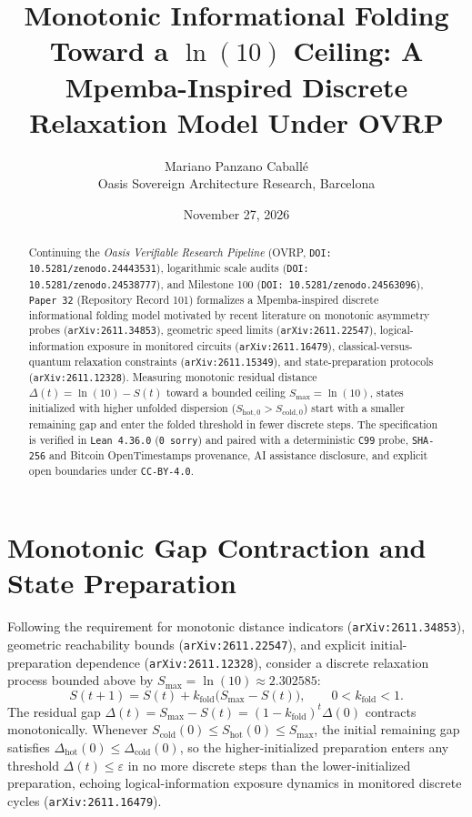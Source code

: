 \documentclass[11pt,a4paper]{article}
\title{Monotonic Informational Folding Toward a $\ln(10)$ Ceiling: A Mpemba-Inspired Discrete Relaxation Model Under OVRP}
\author{Mariano Panzano Caball\'e \\ \small Oasis Sovereign Architecture Research, Barcelona}
\date{November 27, 2026}
\begin{document}
\maketitle

\begin{abstract}
Continuing the \emph{Oasis Verifiable Research Pipeline} (OVRP, \texttt{DOI: 10.5281/zenodo.24443531}), logarithmic scale audits (\texttt{DOI: 10.5281/zenodo.24538777}), and Milestone 100 (\texttt{DOI: 10.5281/zenodo.24563096}), \texttt{Paper~32} (Repository Record 101) formalizes a Mpemba-inspired discrete informational folding model motivated by recent literature on monotonic asymmetry probes (\texttt{arXiv:2611.34853}), geometric speed limits (\texttt{arXiv:2611.22547}), logical-information exposure in monitored circuits (\texttt{arXiv:2611.16479}), classical-versus-quantum relaxation constraints (\texttt{arXiv:2611.15349}), and state-preparation protocols (\texttt{arXiv:2611.12328}). Measuring monotonic residual distance $\Delta(t) = \ln(10) - S(t)$ toward a bounded ceiling $S_{\max} = \ln(10)$, states initialized with higher unfolded dispersion ($S_{\mathrm{hot},0} > S_{\mathrm{cold},0}$) start with a smaller remaining gap and enter the folded threshold in fewer discrete steps. The specification is verified in \texttt{Lean~4.36.0} (\texttt{0~sorry}) and paired with a deterministic \texttt{C99} probe, \texttt{SHA-256} and Bitcoin OpenTimestamps provenance, AI assistance disclosure, and explicit open boundaries under \texttt{CC-BY-4.0}.
\end{abstract}

\section{Monotonic Gap Contraction and State Preparation}
Following the requirement for monotonic distance indicators (\texttt{arXiv:2611.34853}), geometric reachability bounds (\texttt{arXiv:2611.22547}), and explicit initial-preparation dependence (\texttt{arXiv:2611.12328}), consider a discrete relaxation process bounded above by $S_{\max} = \ln(10) \approx 2.302585$:
\begin{equation}
S(t+1) = S(t) + k_{\mathrm{fold}}\bigl(S_{\max} - S(t)\bigr), \qquad 0 < k_{\mathrm{fold}} < 1.
\end{equation}
The residual gap $\Delta(t) = S_{\max} - S(t) = (1 - k_{\mathrm{fold}})^t \Delta(0)$ contracts monotonically. Whenever $S_{\mathrm{cold}}(0) \le S_{\mathrm{hot}}(0) \le S_{\max}$, the initial remaining gap satisfies $\Delta_{\mathrm{hot}}(0) \le \Delta_{\mathrm{cold}}(0)$, so the higher-initialized preparation enters any threshold $\Delta(t) \le \varepsilon$ in no more discrete steps than the lower-initialized preparation, echoing logical-information exposure dynamics in monitored discrete cycles (\texttt{arXiv:2611.16479}).
\end{document}
